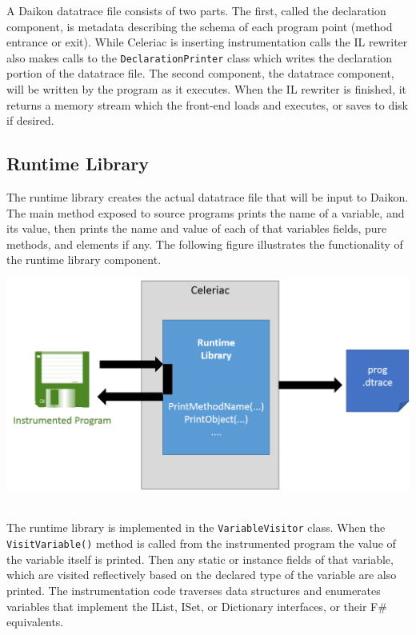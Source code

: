 \documentclass{article}
\begin{document}
A Daikon datatrace file consists of two parts. The first, called the declaration component, is metadata describing the schema of each program point (method entrance or exit).
While Celeriac is inserting instrumentation calls the IL rewriter also makes calls to the \texttt{DeclarationPrinter} class which writes the declaration portion of the datatrace file. The second component, the datatrace component, will be written by the program as it executes. When the IL rewriter is finished, it returns a memory stream which the front-end loads and executes, or saves to disk if desired.

\subsection{Runtime Library}
The runtime library creates the actual datatrace file that will be input to Daikon. The main method exposed to source programs prints the name of a variable, and its value, then prints the name and value of each of that variables fields, pure methods, and elements if any. The following figure illustrates the functionality of the runtime library component.

\begin{center}
\includegraphics[scale=.7]{Arch2}
\end{center} 
\~ \\

The runtime library is implemented in the \texttt{VariableVisitor} class. When the \texttt{VisitVariable()} method is called from the instrumented program the value of the variable itself is printed. Then any static or instance fields of that variable, which are visited reflectively based on the declared type of the variable are also printed. The instrumentation code traverses data structures and enumerates variables that implement the IList, ISet, or Dictionary interfaces, or their F\# equivalents.
\end{document}
